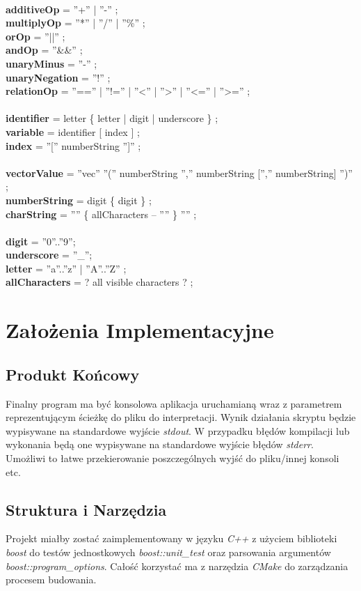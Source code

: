 \documentclass[11pt]{article} %
\begin{document}
\\
\textbf{additiveOp} = ''+'' | ''-­'' ;\\
\textbf{multiplyOp} = ''*'' | ''/'' | ''\%'' ;\\
\textbf{orOp} = ''||'' ;\\
\textbf{andOp} = ''\&\&'' ;\\
\textbf{unaryMinus} = ''-'' ;\\
\textbf{unaryNegation} = ''!'' ;\\
\textbf{relationOp} = ''=='' | ''!='' | ''<'' | ''>'' | ''<='' | ''>='' ;\\
\\
\textbf{identifier} = letter \{ letter | digit | underscore \} ;\\
\textbf{variable} = identifier [ index ] ;\\
\textbf{index} = ''['' numberString '']'' ;\\
\\
\textbf{vectorValue} = ''vec'' ''('' numberString '','' numberString ['','' numberString] '')'' ;\\ 
\textbf{numberString} = digit \{ digit \} ;\\
\textbf{charString} = '''' \{ allCharacters – '''' \} '''' ;\\
\\
\textbf{digit} = ''0''..''9'';\\
\textbf{underscore} = ''\_'';\\
\textbf{letter} = ''a''..''z'' | ''A''..''Z'' ;\\
\textbf{allCharacters} = ? all visible characters ? ;\\

\section{Założenia Implementacyjne}
\subsection{Produkt Końcowy}
Finalny program ma być konsolowa aplikacja uruchamianą wraz z parametrem reprezentującym ścieżkę do pliku do interpretacji. Wynik działania skryptu będzie wypisywane na standardowe wyjście \textsl{stdout}. W przypadku błędów kompilacji lub wykonania będą one wypisywane na standardowe wyjście błędów \textsl{stderr}. Umożliwi to łatwe przekierowanie poszczególnych wyjść do pliku/innej konsoli etc.
\subsection{Struktura i Narzędzia}
Projekt miałby zostać zaimplementowany w języku \textit{C++} z użyciem biblioteki \textit{boost} do testów jednostkowych \textit{boost::unit\_test} oraz parsowania argumentów \textit{boost::program\_options}. Całość korzystać ma z narzędzia \textit{CMake} do zarządzania procesem budowania.
\end{document}
